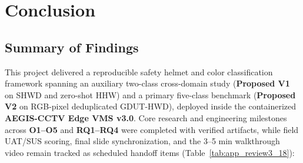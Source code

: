 \chapter{Conclusion}
\label{chap:conclusion}

\section{Summary of Findings}

This project delivered a reproducible safety helmet and color classification framework spanning an auxiliary two-class cross-domain study (\textbf{Proposed V1} on SHWD and zero-shot HHW) and a primary five-class benchmark (\textbf{Proposed V2} on RGB-pixel deduplicated GDUT-HWD), deployed inside the containerized \textbf{AEGIS-CCTV Edge VMS v3.0}. Core research and engineering milestones across \textbf{O1--O5} and \textbf{RQ1--RQ4} were completed with verified artifacts, while field UAT/SUS scoring, final slide synchronization, and the 3--5 min walkthrough video remain tracked as scheduled handoff items (Table~\ref{tab:app_review3_18}):

